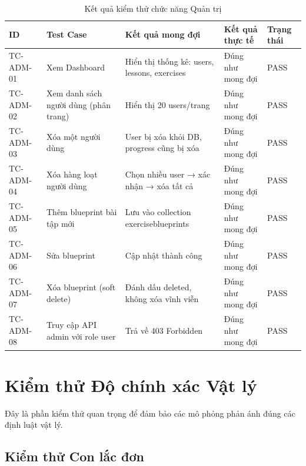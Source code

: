 \begin{table}[H]
\centering
\caption{Kết quả kiểm thử chức năng Quản trị}
\begin{tabular}{|p{}|p{}|p{}|p{}|p{}|}
\hline
\textbf{ID} & \textbf{Test Case} & \textbf{Kết quả mong đợi} & \textbf{Kết quả thực tế} & \textbf{Trạng thái} \\
\hline
TC-ADM-01 & Xem Dashboard & Hiển thị thống kê: users, lessons, exercises & Đúng như mong đợi & PASS \\
\hline
TC-ADM-02 & Xem danh sách người dùng (phân trang) & Hiển thị 20 users/trang & Đúng như mong đợi & PASS \\
\hline
TC-ADM-03 & Xóa một người dùng & User bị xóa khỏi DB, progress cũng bị xóa & Đúng như mong đợi & PASS \\
\hline
TC-ADM-04 & Xóa hàng loạt người dùng & Chọn nhiều user → xác nhận → xóa tất cả & Đúng như mong đợi & PASS \\
\hline
TC-ADM-05 & Thêm blueprint bài tập mới & Lưu vào collection exerciseblueprints & Đúng như mong đợi & PASS \\
\hline
TC-ADM-06 & Sửa blueprint & Cập nhật thành công & Đúng như mong đợi & PASS \\
\hline
TC-ADM-07 & Xóa blueprint (soft delete) & Đánh dấu deleted, không xóa vĩnh viễn & Đúng như mong đợi & PASS \\
\hline
TC-ADM-08 & Truy cập API admin với role user & Trả về 403 Forbidden & Đúng như mong đợi & PASS \\
\hline
\end{tabular}
\end{table}

\section{Kiểm thử Độ chính xác Vật lý}

Đây là phần kiểm thử quan trọng để đảm bảo các mô phỏng phản ánh đúng các định luật vật lý.

\subsection{Kiểm thử Con lắc đơn}

